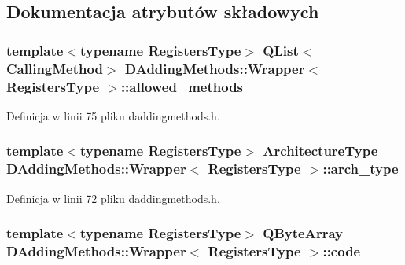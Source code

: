 \subsection{Dokumentacja atrybutów składowych}
\hypertarget{class_d_adding_methods_1_1_wrapper_a7365bd260c137feafcdc7abde67ffedc}{
\subsubsection[{allowed\-\_\-methods}]{\setlength{\rightskip}{0pt plus 5cm}template$<$typename Registers\-Type$>$ Q\-List$<${\bf Calling\-Method}$>$ {\bf D\-Adding\-Methods\-::\-Wrapper}$<$ Registers\-Type $>$\-::allowed\-\_\-methods}}\label{class_d_adding_methods_1_1_wrapper_a7365bd260c137feafcdc7abde67ffedc}


Definicja w linii 75 pliku daddingmethods.\-h.

\hypertarget{class_d_adding_methods_1_1_wrapper_aa4f2505d3abca144ceaae01692ab2982}{
\subsubsection[{arch\-\_\-type}]{\setlength{\rightskip}{0pt plus 5cm}template$<$typename Registers\-Type$>$ {\bf Architecture\-Type} {\bf D\-Adding\-Methods\-::\-Wrapper}$<$ Registers\-Type $>$\-::arch\-\_\-type}}\label{class_d_adding_methods_1_1_wrapper_aa4f2505d3abca144ceaae01692ab2982}


Definicja w linii 72 pliku daddingmethods.\-h.

\hypertarget{class_d_adding_methods_1_1_wrapper_a1280984042d8167b8207d33488189415}{
\subsubsection[{code}]{\setlength{\rightskip}{0pt plus 5cm}template$<$typename Registers\-Type$>$ Q\-Byte\-Array {\bf D\-Adding\-Methods\-::\-Wrapper}$<$ Registers\-Type $>$\-::code}}\label{class_d_adding_methods_1_1_wrapper_a1280984042d8167b8207d33488189415}


